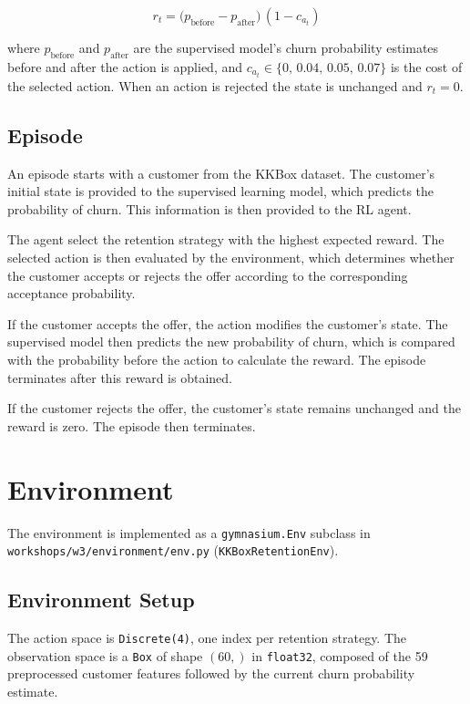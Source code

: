 \documentclass{article}
\begin{document}
\begin{equation}
r_t = \bigl(p_{\text{before}} - p_{\text{after}}\bigr)\,(1 - c_{a_t})
\end{equation}

where $p_{\text{before}}$ and $p_{\text{after}}$ are the supervised model's churn probability
estimates before and after the action is applied, and $c_{a_t} \in \{0,\, 0.04,\, 0.05,\, 0.07\}$ is
the cost of the selected action. When an action is rejected the state is unchanged and
$r_t = 0$.

\subsection{Episode }

An episode starts with a customer from the KKBox dataset. The customer's initial
state is provided to the supervised learning model, which predicts the probability of churn.
This information is then provided to the RL agent.

The agent select the retention strategy with the highest expected reward.
The selected action is then evaluated by the environment, which determines whether the customer
accepts or rejects the offer according to the corresponding acceptance probability.

If the customer accepts the offer, the action modifies the customer's state. The supervised model
then predicts the new probability of churn, which is compared with the probability before the action
to calculate the reward. The episode terminates after this reward is obtained.

If the customer rejects the offer, the customer's state remains unchanged and the reward is zero.
The episode then terminates.


\section{Environment}

The environment is implemented as a \texttt{gymnasium.Env} subclass in
\texttt{workshops/w3/environment/env.py} (\texttt{KKBoxRetentionEnv}).

\subsection{Environment Setup}

The action space is \texttt{Discrete(4)}, one index per retention strategy.
The observation space is a \texttt{Box} of shape $(60,)$ in \texttt{float32},
composed of the 59 preprocessed customer features followed by the current
churn probability estimate.
\end{document}
